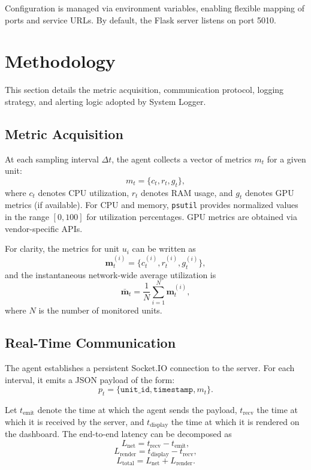 \documentclass[conference]{IEEEtran}
\begin{document}
Configuration is managed via environment variables, enabling flexible mapping of ports and service URLs. By default, the Flask server listens on port 5010.

\section{Methodology}
\label{sec:methodology}

This section details the metric acquisition, communication protocol, logging strategy, and alerting logic adopted by System Logger.

\subsection{Metric Acquisition}

At each sampling interval $\Delta t$, the agent collects a vector of metrics $m_t$ for a given unit:
\begin{equation}
  m_t = \{ c_t, r_t, g_t \},
\end{equation}
where $c_t$ denotes CPU utilization, $r_t$ denotes RAM usage, and $g_t$ denotes GPU metrics (if available). For CPU and memory, \texttt{psutil} provides normalized values in the range $[0, 100]$ for utilization percentages. GPU metrics are obtained via vendor-specific APIs.

For clarity, the metrics for unit $u_i$ can be written as
\begin{equation}
  \mathbf{m}_t^{(i)} = \{ c_t^{(i)}, r_t^{(i)}, g_t^{(i)} \},
\end{equation}
and the instantaneous network-wide average utilization is
\begin{equation}
  \bar{\mathbf{m}}_t = \frac{1}{N} \sum_{i=1}^{N} \mathbf{m}_t^{(i)},
\end{equation}
where $N$ is the number of monitored units.

\subsection{Real-Time Communication}

The agent establishes a persistent Socket.IO connection to the server. For each interval, it emits a JSON payload of the form:
\begin{equation}
  p_t = \{\texttt{unit\_id}, \texttt{timestamp}, m_t\}.
\end{equation}

Let $t_{\text{emit}}$ denote the time at which the agent sends the payload, $t_{\text{recv}}$ the time at which it is received by the server, and $t_{\text{display}}$ the time at which it is rendered on the dashboard. The end-to-end latency can be decomposed as
\begin{equation}
  L_{\text{net}} = t_{\text{recv}} - t_{\text{emit}},
\end{equation}
\begin{equation}
  L_{\text{render}} = t_{\text{display}} - t_{\text{recv}},
\end{equation}
\begin{equation}
  L_{\text{total}} = L_{\text{net}} + L_{\text{render}}.
\end{equation}
\end{document}
